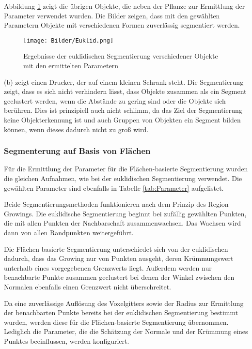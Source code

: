 Abbildung \ref{fig:euklid} zeigt die übrigen Objekte, die neben der Pflanze zur Ermittlung der Parameter verwendet wurden. Die Bilder zeigen, dass mit den gewählten Parametern Objekte mit verschiedenen Formen zuverlässig segmentiert werden. 

\begin{figure}[hp]
	\centering
	\texttt{[image: Bilder/Euklid.png]}
	\caption{Ergebnisse der euklidischen Segmentierung verschiedener Objekte mit den ermittelten Parametern}
	\label{fig:euklid}
\end{figure}

(b) zeigt einen Drucker, der auf einem kleinen Schrank steht. Die Segmentierung zeigt, dass es sich nicht verhindern lässt, dass Objekte zusammen als ein Segment geclustert werden, wenn die Abstände zu gering sind oder die Objekte sich berühren. Dies ist prinzipiell auch nicht schlimm, da das Ziel der Segmentierung keine Objekterkennung ist und auch Gruppen von Objekten ein Segment bilden können, wenn dieses dadurch nicht zu groß wird. 

\subsubsection{Segmenterung auf Basis von Flächen}

Für die Ermittlung der Parameter für die Flächen-basierte Segmentierung wurden die gleichen Aufnahmen, wie bei der euklidischen Segmentierung verwendet. Die gewählten Parameter sind ebenfalls in Tabelle \ref{tab:Parameter} aufgelistet. 

Beide Segmentierungsmethoden funktionieren nach dem Prinzip des Region Growings. Die euklidische Segmentierung beginnt bei zufällig gewählten Punkten, die mit allen Punkten der Nachbarschaft zusammenwachsen. Das Wachsen wird dann von allen Randpunkten weitergeführt. 

Die Flächen-basierte Segmentierung unterschiedet sich von der euklidischen dadurch, dass das Growing nur von Punkten ausgeht, deren Krümmungswert unterhalb eines vorgegebenen Grenzwerts liegt. Außerdem werden nur benachbarte Punkte zusammen geclustert bei denen der Winkel zwischen den Normalen ebenfalls einen Grenzwert nicht überschreitet.  

Da eine zuverlässige Auflösung des Voxelgitters sowie der Radius zur Ermittlung der benachbarten Punkte bereits bei der euklidischen Segmentierung bestimmt wurden, werden diese für die Flächen-basierte Segmentierung übernommen. Lediglich die Parameter, die die Schätzung der Normale und der Krümmung eines Punktes beeinflussen, werden konfiguriert. 

